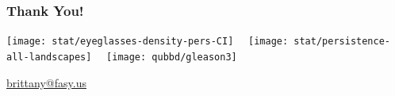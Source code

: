 \begin{frame}
\frametitle{Thank You!}

    \centering
    \texttt{[image: stat/eyeglasses-density-pers-CI]}~~
    \texttt{[image: stat/persistence-all-landscapes]}~~
    \texttt{[image: qubbd/gleason3]}

    \begin{block}{}
        \centering
        \url{brittany@fasy.us}
    \end{block}
\end{frame}
